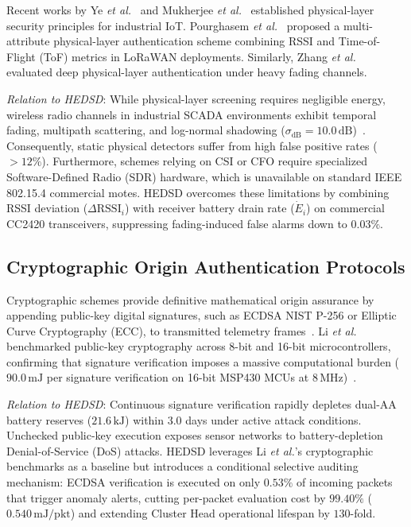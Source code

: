 \documentclass[conference]{IEEEtran}
\begin{document}
Recent works by Ye \textit{et al.}~\cite{ref_ye_cfo_2023} and Mukherjee \textit{et al.}~\cite{ref_mukherjee_survey_2024} established physical-layer security principles for industrial IoT. Pourghasem \textit{et al.}~\cite{ref_pla_mdpi_2024} proposed a multi-attribute physical-layer authentication scheme combining RSSI and Time-of-Flight (ToF) metrics in LoRaWAN deployments. Similarly, Zhang \textit{et al.}~\cite{ref_zhang_tifs_2024} evaluated deep physical-layer authentication under heavy fading channels.

\textit{Relation to HEDSD}: While physical-layer screening requires negligible energy, wireless radio channels in industrial SCADA environments exhibit temporal fading, multipath scattering, and log-normal shadowing ($\sigma_{\text{dB}} = 10.0\,\text{dB}$)~\cite{ref_rssi_finger_19, ref_lognormal_shadow_45}. Consequently, static physical detectors suffer from high false positive rates ($>12\%$). Furthermore, schemes relying on CSI or CFO require specialized Software-Defined Radio (SDR) hardware, which is unavailable on standard IEEE 802.15.4 commercial motes. HEDSD overcomes these limitations by combining RSSI deviation ($\Delta\text{RSSI}_i$) with receiver battery drain rate ($\dot{E}_i$) on commercial CC2420 transceivers, suppressing fading-induced false alarms down to $0.03\%$.

\subsection{Cryptographic Origin Authentication Protocols}
Cryptographic schemes provide definitive mathematical origin assurance by appending public-key digital signatures, such as ECDSA NIST P-256 or Elliptic Curve Cryptography (ECC), to transmitted telemetry frames~\cite{ref_ecc_wsn_10, ref_tinyecc_24}. Li \textit{et al.}~\cite{ref_li_iotm_2025} benchmarked public-key cryptography across 8-bit and 16-bit microcontrollers, confirming that signature verification imposes a massive computational burden ($90.0\,\text{mJ}$ per signature verification on 16-bit MSP430 MCUs at $8\,\text{MHz}$)~\cite{ref_crypto_cost_11, ref_mcu_energy_12}.

\textit{Relation to HEDSD}: Continuous signature verification rapidly depletes dual-AA battery reserves ($21.6\,\text{kJ}$) within $3.0$ days under active attack conditions. Unchecked public-key execution exposes sensor networks to battery-depletion Denial-of-Service (DoS) attacks. HEDSD leverages Li \textit{et al.}'s cryptographic benchmarks as a baseline but introduces a conditional selective auditing mechanism: ECDSA verification is executed on only $0.53\%$ of incoming packets that trigger anomaly alerts, cutting per-packet evaluation cost by $99.40\%$ ($0.540\,\text{mJ/pkt}$) and extending Cluster Head operational lifespan by $130$-fold.
\end{document}
